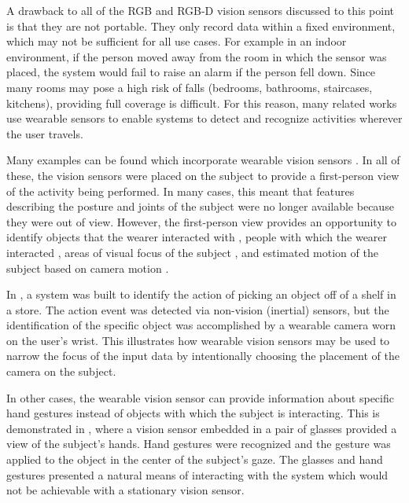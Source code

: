 \documentclass[12pt]{report}
\begin{document}
A drawback to all of the RGB and RGB-D vision sensors discussed to this point is that they are not portable. They only record data within a fixed environment, which may not be sufficient for all use cases. For example in an indoor environment, if the person moved away from the room in which the sensor was placed, the system would fail to raise an alarm if the person fell down. Since many rooms may pose a high risk of falls (bedrooms, bathrooms, staircases, kitchens), providing full coverage is difficult. For this reason, many related works use wearable sensors to enable systems to detect and recognize activities wherever the user travels.

Many examples can be found which incorporate wearable vision sensors \cite{Radhakrishnan2016, Mahabalagiri2013, Li2016, Baraldi2015, McCandless2013, Wang2018, Damen2018ScalingDataset, Sudhakaran2018, Gokce2019HumanPairs}. In all of these, the vision sensors were placed on the subject to provide a first-person view of the activity being performed. In many cases, this meant that features describing the posture and joints of the subject were no longer available because they were out of view. However, the first-person view provides an opportunity to identify objects that the wearer interacted with \cite{Pirsiavash2012, Radhakrishnan2016, McCandless2013, Damen2018ScalingDataset}, people with which the wearer interacted \cite{Li2016}, areas of visual focus of the subject \cite{Sudhakaran2018, Matsuo2014}, and estimated motion of the subject based on camera motion \cite{Mahabalagiri2013}. 

In \cite{Radhakrishnan2016}, a system was built to identify the action of picking an object off of a shelf in a store. The action event was detected via non-vision (inertial) sensors, but the identification of the specific object was accomplished by a wearable camera worn on the user's wrist. This illustrates how wearable vision sensors may be used to narrow the focus of the input data by intentionally choosing the placement of the camera on the subject.

In other cases, the wearable vision sensor can provide information about specific hand gestures instead of objects with which the subject is interacting. This is demonstrated in \cite{Baraldi2015}, where a vision sensor embedded in a pair of glasses provided a view of the subject’s hands. Hand gestures were recognized and the gesture was applied to the object in the center of the subject’s gaze. The glasses and hand gestures presented a natural means of interacting with the system which would not be achievable with a stationary vision sensor.
\end{document}
